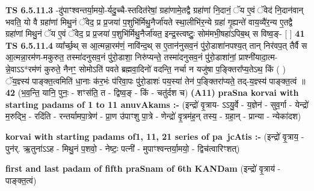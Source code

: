 \documentclass[17pt]{extarticle}
\begin{document}
                  \newline
                                \textbf{ TS 6.5.11.3} \newline
                  -दु॑पाꣳश्वन्तर्या॒मयो॒-र्यदु॒च्चै-स्तदित॑रेषां॒ ग्रहा॑णामे॒तद्वै ग्रहा॑णां नि॒दानं॒ ॅय ए॒वं ॅवेद॑ नि॒दान॑वान् भवति॒ यो वै ग्रहा॑णां मिथु॒नं ॅवेद॒ प्र प्र॒जया॑ प॒शुभि॑र्मिथु॒नैर्जा॑यते स्था॒लीभि॑र॒न्ये ग्रहा॑ गृ॒ह्यन्ते॑ वाय॒व्यै॑र॒न्य ए॒तद्वै ग्रहा॑णां मिथु॒नं ॅय ए॒वं ॅवेद॒ प्र प्र॒जया॑ प॒शुभि॑र्मिथु॒नैर्जा॑यत॒ इन्द्र॒स्त्वष्टुः॒ सोम॑मभी॒षहा॑ऽपिब॒थ् स विष्व॒ङ्- [  ] \textbf{  41} \newline
                  \newline
                                \textbf{ TS 6.5.11.4} \newline
                  व्या᳚र्च्छ॒थ् स आ॒त्मन्ना॒रम॑णं॒ नावि॑न्द॒थ् स ए॒तान॑नुसव॒नं पु॑रो॒डाशा॑नपश्य॒त् तान् निर॑वप॒त् तैर्वै स आ॒त्मन्ना॒रम॑ण-मकुरुत॒ तस्मा॑दनुसव॒नं पु॑रो॒डाशा॒ निरु॑प्यन्ते॒ तस्मा॑दनुसव॒नं पु॑रो॒डाशा॑नां॒ प्राश्नी॑यादा॒त्म-न्ने॒वाऽऽ*रम॑णं कुरुते॒ नैनꣳ॒॒ सोमोऽति॑ पवते ब्रह्मवा॒दिनो॑ वदन्ति॒ नर्चा न यजु॑षा प॒ङ्क्तिरा᳚प्य॒तेऽथ॒ किं ( ) ॅय॒ज्ञ्स्य॑ पाङ्क्त॒त्वमिति॑ धा॒नाः क॑र॒भंः प॑रिवा॒पः पु॑रो॒डाशः॑ पय॒स्या॑ तेन॑ प॒ङ्क्तिरा॑प्यते॒ तद्-य॒ज्ञ्स्य॑ पाङ्क्त॒त्वं ॥ \textbf{  42 } \newline
                  \newline
                      (भ॒व॒न्ति॒ यानि॒ पुनः॒ - शꣳस॑ति॒ त - द्विष्व॒ङ् - किं - चतु॑र्दश च)  \textbf{(A11)} \newline \newline
                \textbf{praSna korvai with starting padams of 1 to 11 anuvAkams :-} \newline
        (इन्द्रो॑ वृ॒त्राय- ऽऽयु॒र्वे - य॒ज्ञेन॑ - सुव॒र्गा - येन्द्रो॑ म॒रुद्भि॒ - रदि॑ति - रन्तर्यामपा॒त्रेण॑ - प्रा॒ण उ॑पाꣳशु पा॒त्रे - णेन्द्रो॑ वृ॒त्रम॑ह॒॒न् तस्य॒ - ग्रहा॒न् - प्रान्या - न्येका॑दश) \newline

        \textbf{korvai with starting padams of1, 11, 21 series of pa~jcAtis :-} \newline
        (इन्द्रो॑ वृ॒त्राय॒ - पुन॑र्. ऋ॒तुना॑ऽऽह - मिथु॒नं प॒शवो॒ - नेष्टः॒ पत्नी॑ - मुपाꣳश्वन्तर्या॒मयो॒ - द्विच॑त्वारिꣳशत्) \newline

        \textbf{first and last padam of fifth praSnam of 6th KANDam} \newline
        (इन्द्रो॑ वृ॒त्राय॑ - पाङ्क्त॒त्वं) \newline 
\end{document}
